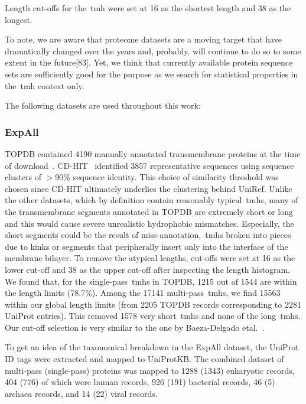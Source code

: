 Length cut-offs for the~\gls{tmh} were set at 16 as the shortest length and 38 as the longest.

To note, we are aware that proteome datasets are a moving target that have dramatically changed over the years and, probably, will continue to do so to some extent in the future[83].
Yet, we think that currently available protein sequence sets are sufficiently good for the purpose as we search for statistical properties in the~\gls{tmh} context only.

The following datasets are used throughout this work:

\subsubsection{ExpAll}

TOPDB contained 4190 manually annotated transmembrane proteins at the time of download~\cite{Dobson2015}.
CD-HIT~\cite{Huang2010} identified 3857 representative sequences using sequence clusters of $>$90\% sequence identity.
This choice of similarity threshold was chosen since CD-HIT ultimately underlies the clustering behind UniRef.
Unlike the other datasets, which by definition contain reasonably typical~\gls{tmh}s, many of the transmembrane segments annotated in TOPDB are extremely short or long and this would cause severe unrealistic hydrophobic mismatches.
Especially, the short segments could be the result of miss-annotation,~\gls{tmh}s broken into pieces due to kinks or segments that peripherally insert only into the interface of the membrane bilayer.
To remove the atypical lengths, cut-offs were set at 16 as the lower cut-off and 38 as the upper cut-off after inspecting the length histogram.
We found that, for the single-pass~\gls{tmh}s in TOPDB, 1215 out of 1544 are within the length limits (78.7\%).
Among the 17141 multi-pass~\gls{tmh}s, we find 15563 within our global length limits (from 2205 TOPDB records corresponding to 2281 UniProt entries).
This removed 1578 very short~\gls{tmh}s and none of the long~\gls{tmh}s.
Our cut-off selection is very similar to the one by Baeza-Delgado etal.~\cite{Baeza-Delgado2013}.

To get an idea of the taxonomical breakdown in the ExpAll dataset, the UniProt ID tags were extracted and mapped to UniProtKB.
The combined dataset of multi-pass (single-pass) proteins was mapped to 1288 (1343) eukaryotic records, 404 (776) of which were human records, 926 (191) bacterial records, 46 (5) archaea records, and 14 (22) viral records.


